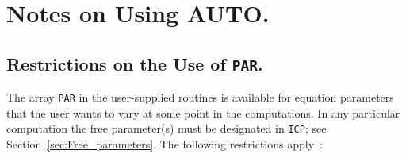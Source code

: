 \documentclass[12pt]{report}
\begin{document}
\chapter{ Notes on Using {\cal AUTO}.}  \label{ch:Notes_on_Using_AUTO}
\section{ Restrictions on the Use of \texttt{PAR}.} \label{sec:Restrictions_on_PAR}
The array {\tt PAR} in the user-supplied routines is available
for equation parameters that the user wants to vary at some point
in the computations.
In any particular computation the free parameter(s) must be designated
in {\tt ICP}; see Section~\ref{sec:Free_parameters}.
The following restrictions apply~:
\end{document}
